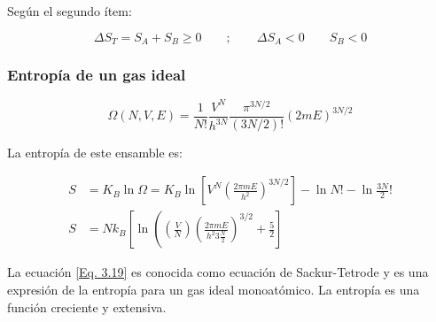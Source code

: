 \documentclass[11pt,fleqn]{book}
\begin{document}
Según el segundo ítem:

\begin{equation}
      \Delta S_{T}=S_{A}+S_{B}\geq0\qquad;\qquad\Delta S_{A}<0 \qquad S_{B}<0
      \label{Eq. 3.17}
\end{equation}


\subsubsection{Entropía de un gas ideal}


\begin{equation}
\Omega(N, V, E)=\frac{1}{N !} \frac{V^{N}}{h^{3 N}} \frac{\pi^{3 N / 2}}{(3 N / 2) !}(2 m E)^{3 N / 2}
\label{Eq. 3.19}
\end{equation}

La entropía de este ensamble es:

\begin{equation}
\begin{split}
    S&=K_{B} \ln \Omega=K_{B} \ln \left[V^{N}\left(\frac{2 \pi m E}{h^{2}}\right)^{3 N / 2}\right]-\ln N !-\ln \frac{3 N}{2}!\\
    S&=N k_{B}\left[\ln \left(\left(\frac{V}{N}\right)\left(\frac{2 \pi m E}{h^{2} 3\frac{ N }{ 2}}\right)^{3 / 2}+\frac{5}{2}\right]\right.
\end{split}
\label{Eq. 3.19}
\end{equation}

La ecuación \ref{Eq. 3.19} es conocida como ecuación de Sackur-Tetrode y es una expresión de la entropía para un gas ideal monoatómico. La entropía es una función creciente y extensiva.
\end{document}
